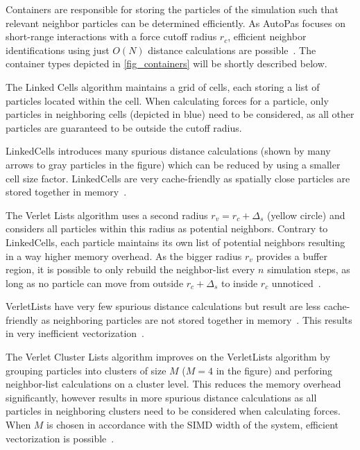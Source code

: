 \documentclass[conference]{IEEEtran}
\begin{document}
\begin{description}[style=nextline]
    \item[Container]
        Containers are responsible for storing the particles of the simulation such that relevant neighbor particles can be determined efficiently. As AutoPas focuses on short-range interactions with a force cutoff radius $r_c$, efficient neighbor identifications using just $O(N)$ distance calculations are possible~\cite{Gratl2019AutoPas}. The container types depicted in \autoref{fig_containers} will be shortly described below.

        \begin{description}[style=nextline, font=\itshape]
            \item[$\bullet$ Linked Cells]
                The Linked Cells algorithm maintains a grid of cells, each storing a list of particles located within the cell. When calculating forces for a particle, only particles in neighboring cells (depicted in blue) need to be considered, as all other particles are guaranteed to be outside the cutoff radius.

                LinkedCells introduces many spurious distance calculations (shown by many arrows to gray particles in the figure) which can be reduced by using a smaller cell size factor. LinkedCells are very cache-friendly as spatially close particles are stored together in memory~\cite{Gratl2022AutoPas}.

            \item[$\bullet$ Verlet Lists]
                The Verlet Lists algorithm uses a second radius $r_v = {r_c} + \Delta_s$ (yellow circle) and considers all particles within this radius as potential neighbors. Contrary to LinkedCells, each particle maintains its own list of potential neighbors resulting in a way higher memory overhead.
                As the bigger radius $r_v$ provides a buffer region, it is possible to only rebuild the neighbor-list every $n$ simulation steps, as long as no particle can move from outside $r_c + \Delta_s$ to inside $r_c$ unnoticed~\cite{NEWCOME2023115278}.

                VerletLists have very few spurious distance calculations but result are less cache-friendly as neighboring particles are not stored together in memory~\cite{Gratl2022AutoPas}. This results in very inefficient vectorization~\cite{PALL20132641}.

            \item[$\bullet$ Verlet Cluster Lists]
                The Verlet Cluster Lists algorithm improves on the VerletLists algorithm by grouping particles into clusters of size $M$ ($M=4$ in the figure) and perforing neighbor-list calculations on a cluster level. This reduces the memory overhead significantly, however results in more spurious distance calculations as all particles in neighboring clusters need to be considered when calculating forces. When $M$ is chosen in accordance with the SIMD width of the system, efficient vectorization is possible~\cite{Gratl2022AutoPas}.
        \end{description}


\end{description}
\end{document}
